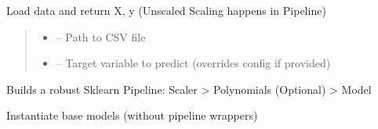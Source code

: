 \documentclass[a4paper,11pt,english,openany,oneside]{sphinxmanual}
\begin{document}
\begin{fulllineitems}
\begin{fulllineitems}
\label{\detokenize{modules/core:core.regression.DataProcessor.load_and_clean}}
\pysigstartsignatures
\pysiglinewithargsret
{}
{\sphinxparamcomma {}}
{}
\pysigstopsignatures
\sphinxAtStartPar
Load data and return X, y (Unscaled \sphinxhyphen{} Scaling happens in Pipeline)
\begin{quote}\begin{description}
\begin{itemize}
\item {} 
\sphinxAtStartPar
{} – Path to CSV file

\item {} 
\sphinxAtStartPar
{} – Target variable to predict (overrides config if provided)

\end{itemize}

\end{description}\end{quote}

\end{fulllineitems}


\end{fulllineitems}


\begin{fulllineitems}
\label{\detokenize{modules/core:core.regression.create_pipeline}}
\pysigstartsignatures
\pysiglinewithargsret
{}
{\sphinxparamcomma {}}
{}
\pysigstopsignatures
\sphinxAtStartPar
Builds a robust Sklearn Pipeline:
Scaler \sphinxhyphen{}> Polynomials (Optional) \sphinxhyphen{}> Model

\end{fulllineitems}


\begin{fulllineitems}
\label{\detokenize{modules/core:core.regression.get_base_models}}
\pysigstartsignatures
\pysiglinewithargsret
{}
{}
{}
\pysigstopsignatures
\sphinxAtStartPar
Instantiate base models (without pipeline wrappers)

\end{fulllineitems}
\end{document}
